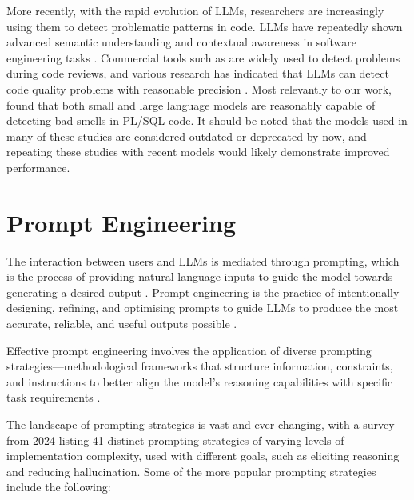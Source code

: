 More recently, with the rapid evolution of LLMs, researchers are increasingly using them to detect problematic patterns in code. LLMs have repeatedly shown advanced semantic understanding and contextual awareness in software engineering tasks . Commercial tools such as  are widely used to detect problems during code reviews, and various research has indicated that LLMs can detect code quality problems with reasonable precision . Most relevantly to our work,  found that both small and large language models are reasonably capable of detecting bad smells in PL/SQL code. It should be noted that the models used in many of these studies are considered outdated or deprecated by now, and repeating these studies with recent models would likely demonstrate improved performance.

\section{Prompt Engineering}\label{sec:promptEngineering}

The interaction between users and LLMs is mediated through prompting, which is the process of providing natural language inputs to guide the model towards generating a desired output . Prompt engineering is the practice of intentionally designing, refining, and optimising prompts to guide LLMs to produce the most accurate, reliable, and useful outputs possible .

Effective prompt engineering involves the application of diverse prompting strategies—methodological frameworks that structure information, constraints, and instructions to better align the model's reasoning capabilities with specific task requirements .

The landscape of prompting strategies is vast and ever-changing, with a survey from 2024  listing \num{41} distinct prompting strategies of varying levels of implementation complexity, used with different goals, such as eliciting reasoning and reducing hallucination. Some of the more popular prompting strategies include the following:

